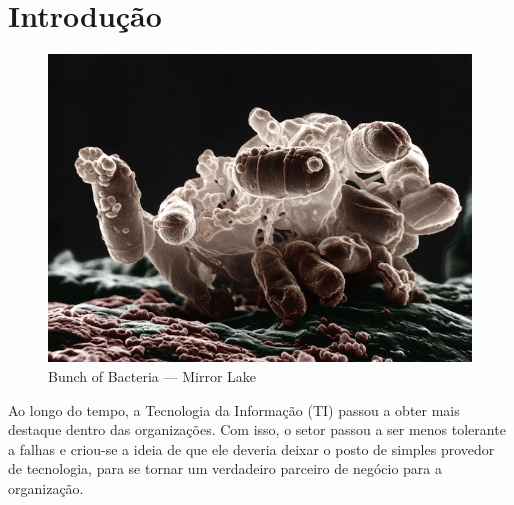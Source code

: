 %
%
%
%


\chapter{Introdução}
\label{cha:intro}


\begin{figure}
    \centering
    \includegraphics[width=1\textwidth]{img/bacteria_bunch}\\
    {\scriptsize Bunch of Bacteria --- Mirror Lake}
\end{figure}

Ao longo do tempo, a Tecnologia da Informação (TI) passou a obter mais destaque
dentro das organizações. Com isso, o setor passou a ser menos tolerante a
falhas e criou-se a ideia de que ele deveria deixar o posto de simples provedor
de tecnologia, para se tornar um verdadeiro parceiro de negócio para a
organização.
%

